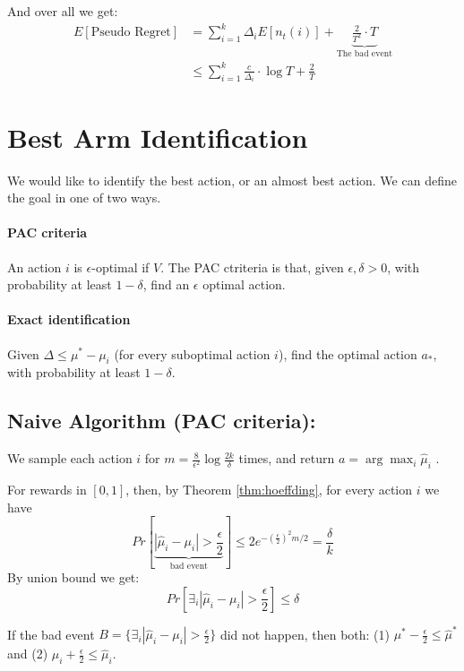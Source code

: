 And over all we get:
\begin{align*}
E\left[\text{Pseudo Regret}\right] & =
\sum_{i=1}^{k}\Delta_{i}E\left[n_{t}(i)\right]+\underbrace{\frac{2}{T^{2}}\cdot
T}_{\text{The bad event}}
\\
 & \le  \sum_{i=1}^{k}\frac{c}{\Delta_{i}}\cdot\log T+\frac{2}{T}
\end{align*}

\section{Best Arm Identification}

We would like to identify the best action, or an almost best action.
We can define the goal in one of two ways.

\paragraph{PAC criteria }
An action $i$ is $\epsilon$-optimal if  $V$. The PAC ctriteria is
that, given $\epsilon,\delta>0$, with probability at least
$1-\delta$, find an $\epsilon$ optimal action.

\paragraph{Exact identification}
Given $\Delta\le\mu^{*}-\mu_{i}$ (for every suboptimal action $i$),
find the optimal action $a_{*}$, with probability at least
$1-\delta$.

\subsection{Naive Algorithm (PAC criteria):}

We sample each action $i$ for
$m=\frac{8}{\epsilon^{2}}\log\frac{2k}{\delta}$ times, and return
$a= \arg\max_{i}\hat{\mu}_{i}$ .

For rewards in $[ 0 ,1]$, then, by Theorem \ref{thm:hoeffding}, for
every action $i$ we have
\[
Pr\left[\underbrace{\left|\hat{\mu}_{i}-\mu_{i}\right|>\frac{\epsilon}{2}}_{\text{bad
event}}\right]\le 2
e^{-\left(\frac{\epsilon}{2}\right)^{2}m/2}=\frac{\delta}{k}
\]
By union bound we get:
\[
Pr\left[\exists_{i}\left|\hat{\mu}_{i}-\mu_{i}\right|>\frac{\epsilon}{2}\right]\le\delta
\]

If the bad event
$B=\{\exists_{i}\left|\hat{\mu}_{i}-\mu_{i}\right|>\frac{\epsilon}{2}\}$
did not happen, then both: (1)
$\mu^{*}-\frac{\epsilon}{2}\le\hat{\mu}^{*}$ and (2)
$\mu_{i}+\frac{\epsilon}{2}\le\hat{\mu}_{i}$.


